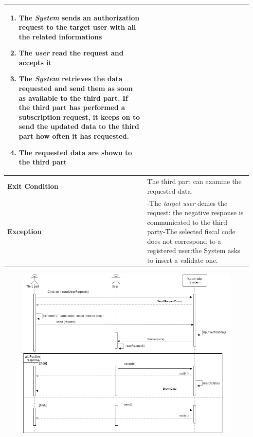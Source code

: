 \begin{table}[H]
\begin{tabular}{|p{3.5cm}|p{10.3cm}|}
\begin{enumerate}[leftmargin=0.5cm]
                            \item The \emph{System} sends an authorization request to the target user with all the related informations
                                            
                                            \item  The  \emph{user} read the request and accepts it
                                            \item The \emph{System} retrieves the data requested and send them as soon as available to the third part. If the third part has performed a subscription request, it keeps on to send the updated data to the third part how often it has requested.
                                            \item The requested data are shown to the third part
                                
                                          \end{enumerate}
    										\\
    \hline
    \textbf{\large{Exit Condition}} 	& The third part can examine the requested data. \\
    
    \hline
    \textbf{\large{Exception}} 			& -The \emph{target user} denies the request: the negative response is communicated to the third party\newline -The selected fiscal code does not correspond to a registered user:the System asks to insert a validate one.\\
    
    \hline
    
    
    \end{tabular}
	
\end{table}
\begin{figure}[H]
    \centering
    \includegraphics[scale=0.4]{rasdL/Pictures/request1.png}
\end{figure}

